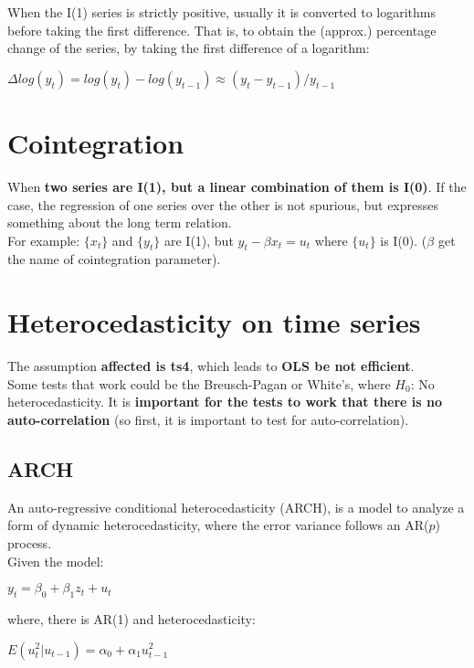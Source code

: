 \documentclass[10pt, a4paper, landscape]{extarticle}
\begin{document}
\begin{multicols}{3}
\begin{multicols}{2}
		\end{multicols}
		When the I(1) series is strictly positive, usually it is converted to logarithms before taking the first difference. That is, to obtain the (approx.) percentage change of the series, by taking the first difference of a logarithm:
		\begin{center}
			$\Delta log(y_t) = log(y_t) - log(y_{t-1}) \approx (y_t - y_{t-1}) / y_{t-1}$
		\end{center}

\columnbreak

\section*{Cointegration}
	When \textbf{two series are I(1), but a linear combination of them is I(0)}. If the case, the regression of one series over the other is not spurious, but expresses something about the long term relation.
	\\ For example: $\lbrace x_t \rbrace$ and $\lbrace y_t \rbrace$ are I(1), but $y_t - \beta x_t = u_t$ where $\lbrace u_t \rbrace$ is I(0). ($\beta$ get the name of cointegration parameter).

\section*{Heterocedasticity on time series}
	The assumption \textbf{affected is ts4}, which leads to \textbf{OLS be not efficient}. 
	\\ Some tests that work could be the Breusch-Pagan or White's, where $H_0$: No heterocedasticity. It is \textbf{important for the tests to work that there is no auto-correlation} (so first, it is important to test for auto-correlation).
	\subsection*{ARCH}
		An auto-regressive conditional heterocedasticity (ARCH), is a model to analyze a form of dynamic heterocedasticity, where the error variance follows an AR($p$) process.
		\\ Given the model:
		\begin{center}
			$y_t = \beta_0 + \beta_1 z_t + u_t$
		\end{center}
		where, there is AR(1) and heterocedasticity:
		\begin{center}
			$E(u^2_t | u_{t-1}) = \alpha_0 + \alpha_1 u^2_{t-1}$
		\end{center}

\end{multicols}
\end{document}
